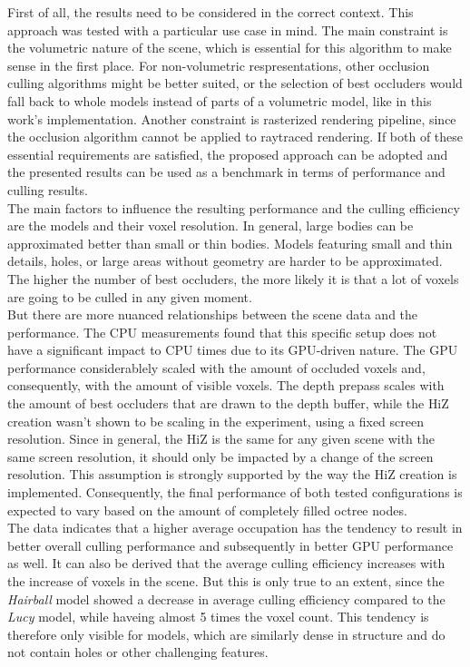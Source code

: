 \noindent
First of all, the results need to be considered in the correct context. This approach was tested with a particular use case 
in mind. The main constraint is the volumetric nature of the scene, which is essential for this algorithm to make sense in 
the first place. For non-volumetric respresentations, other occlusion culling algorithms might be better suited, or the 
selection of best occluders would fall back to whole models instead of parts of a volumetric model, like in this work's 
implementation. Another constraint is rasterized rendering pipeline, since the occlusion algorithm cannot be applied to 
raytraced rendering. If both of these essential requirements are satisfied, the proposed approach can be adopted and the 
presented results can be used as a benchmark in terms of performance and culling results. \\

\noindent
The main factors to influence the resulting performance and the culling efficiency are the models and their voxel resolution.
In general, large bodies can be approximated better than small or thin bodies. Models featuring small and thin details, holes, 
or large areas without geometry are harder to be approximated. The higher the number of best occluders, the more likely it is 
that a lot of voxels are going to be culled in any given moment. \\

\noindent
But there are more nuanced relationships between the scene data and the performance. The \ac{CPU} measurements found that this 
specific setup does not have a significant impact to \ac{CPU} times due to its \ac{GPU}-driven nature. The \ac{GPU} performance 
considerablely scaled with the amount of occluded voxels and, consequently, with the amount of visible voxels. The depth prepass 
scales with the amount of best occluders that are drawn to the depth buffer, while the \ac{HiZ} creation wasn't shown to be scaling 
in the experiment, using a fixed screen resolution. Since in general, the \ac{HiZ} is the same for any given scene with the same 
screen resolution, it should only be impacted by a change of the screen resolution. This assumption is strongly supported by the 
way the \ac{HiZ} creation is implemented. Consequently, the final performance of both tested configurations is expected to vary 
based on the amount of completely filled octree nodes. \\

\noindent
The data indicates that a higher average occupation has the tendency to result in better overall culling performance and subsequently 
in better \ac{GPU} performance as well. It can also be derived that the average culling efficiency increases with the increase of 
voxels in the scene. But this is only true to an extent, since the \emph{Hairball} model showed a decrease in average culling efficiency 
compared to the \emph{Lucy} model, while haveing almost 5 times the voxel count. This tendency is therefore only visible for models, 
which are similarly dense in structure and do not contain holes or other challenging features.\\

